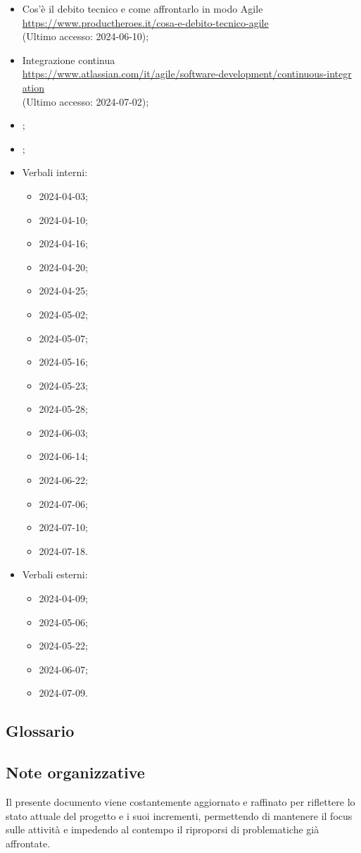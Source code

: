 \begin{itemize}
  \item Cos'è il debito tecnico e come affrontarlo in modo Agile \\ \href{https://www.productheroes.it/cosa-e-debito-tecnico-agile}{https://www.productheroes.it/cosa-e-debito-tecnico-agile}  \\ (Ultimo accesso: 2024-06-10);
  \item Integrazione continua \\ \href{https://www.atlassian.com/it/agile/software-development/continuous-integration}{https://www.atlassian.com/it/agile/software-development/continuous-integr \- ation}  \\ (Ultimo accesso: 2024-07-02);
  \item \PianoDiQualifica;
  \item \Glossario;
  \item Verbali interni:
  \begin{itemize}
    \item 2024-04-03;
    \item 2024-04-10;
    \item 2024-04-16;
    \item 2024-04-20;
    \item 2024-04-25;
    \item 2024-05-02;
    \item 2024-05-07;
    \item 2024-05-16;
    \item 2024-05-23;
    \item 2024-05-28;
    \item 2024-06-03;
    \item 2024-06-14;
    \item 2024-06-22;
    \item 2024-07-06;
    \item 2024-07-10;
    \item 2024-07-18.
  \end{itemize}
  \item Verbali esterni:
  \begin{itemize}
    \item 2024-04-09;
    \item 2024-05-06;
    \item 2024-05-22;
    \item 2024-06-07;
    \item 2024-07-09.
  \end{itemize}
\end{itemize}

\subsection{Glossario} 
\GlossarioIntroduzione

\subsection{Note organizzative}
Il presente documento viene costantemente aggiornato e raffinato per riflettere lo stato attuale del progetto e i suoi incrementi, permettendo di mantenere il focus sulle attività e impedendo al contempo il riproporsi di problematiche già affrontate.
